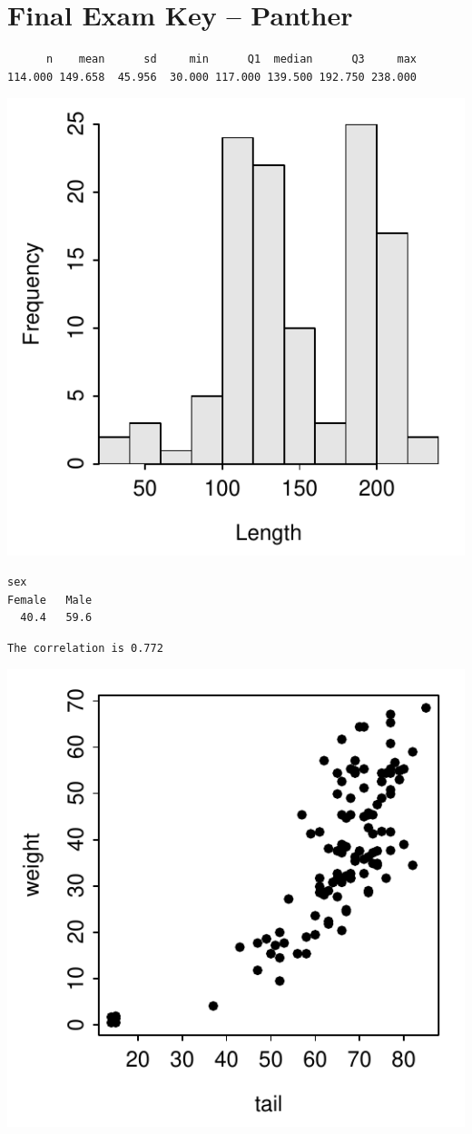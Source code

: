 \documentclass{article}\usepackage[]{graphicx}\usepackage[]{color}
\makeatletter
\newenvironment{kframe}{%
 \def\at@end@of@kframe{}%
 \ifinner\ifhmode%
  \def\at@end@of@kframe{\end{minipage}}%
  \begin{minipage}{\columnwidth}%
 \fi\fi%
 \def\FrameCommand##1{\hskip\@totalleftmargin \hskip-\fboxsep
 \colorbox{shadecolor}{##1}\hskip-\fboxsep
     \hskip-\linewidth \hskip-\@totalleftmargin \hskip\columnwidth}%
 \MakeFramed {\advance\hsize-\width
   \@totalleftmargin\z@ \linewidth\hsize
   \@setminipage}}%
 {\par\unskip\endMakeFramed%
 \at@end@of@kframe}
\newenvironment{knitrout}{}{} %
\makeatother
\begin{document}
\section*{Final Exam Key -- Panther}



\begin{knitrout}
\color{fgcolor}\begin{kframe}
\begin{verbatim}
      n    mean      sd     min      Q1  median      Q3     max 
114.000 149.658  45.956  30.000 117.000 139.500 192.750 238.000 
\end{verbatim}
\end{kframe}

{\centering \includegraphics[width=.4\linewidth]{Figs/unnamed-chunk-1-1} 

}



\end{knitrout}
\begin{knitrout}
\color{fgcolor}\begin{kframe}
\begin{verbatim}
sex
Female   Male 
  40.4   59.6 
\end{verbatim}
\end{kframe}
\end{knitrout}
\begin{knitrout}
\color{fgcolor}\begin{kframe}
\begin{verbatim}
The correlation is 0.772
\end{verbatim}
\end{kframe}

{\centering \includegraphics[width=.4\linewidth]{Figs/unnamed-chunk-3-1} 

}



\end{knitrout}
\end{document}
